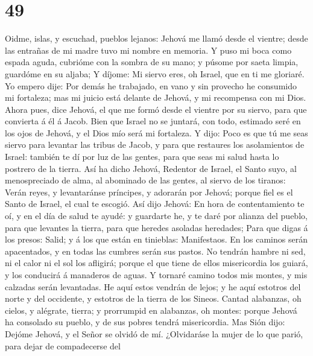 \hypertarget{section-48}{%
\section{49}\label{section-48}}

 Oidme, islas, y escuchad, pueblos lejanos: Jehová me
llamó desde el vientre; desde las entrañas de mi madre tuvo mi nombre en
memoria.  Y puso mi boca como espada aguda, cubrióme con
la sombra de su mano; y púsome por saeta limpia, guardóme en su aljaba;
 Y díjome: Mi siervo eres, oh Israel, que en ti me
gloriaré.  Yo empero dije: Por demás he trabajado, en vano
y sin provecho he consumido mi fortaleza; mas mi juicio está delante de
Jehová, y mi recompensa con mi Dios.  Ahora pues, dice
Jehová, el que me formó desde el vientre por su siervo, para que
convierta á él á Jacob. Bien que Israel no se juntará, con todo,
estimado seré en los ojos de Jehová, y el Dios mío será mi fortaleza.
 Y dijo: Poco es que tú me seas siervo para levantar las
tribus de Jacob, y para que restaures los asolamientos de Israel:
también te dí por luz de las gentes, para que seas mi salud hasta lo
postrero de la tierra.  Así ha dicho Jehová, Redentor de
Israel, el Santo suyo, al menospreciado de alma, al abominado de las
gentes, al siervo de los tiranos: Verán reyes, y levantaránse príncipes,
y adorarán por Jehová; porque fiel es el Santo de Israel, el cual te
escogió.  Así dijo Jehová: En hora de contentamiento te
oí, y en el día de salud te ayudé: y guardarte he, y te daré por alianza
del pueblo, para que levantes la tierra, para que heredes asoladas
heredades;  Para que digas á los presos: Salid; y á los
que están en tinieblas: Manifestaos. En los caminos serán apacentados, y
en todas las cumbres serán sus pastos.  No tendrán hambre
ni sed, ni el calor ni el sol los afligirá; porque el que tiene de ellos
misericordia los guiará, y los conducirá á manaderos de aguas.
 Y tornaré camino todos mis montes, y mis calzadas serán
levantadas.  He aquí estos vendrán de lejos; y he aquí
estotros del norte y del occidente, y estotros de la tierra de los
Sineos.  Cantad alabanzas, oh cielos, y alégrate, tierra;
y prorrumpid en alabanzas, oh montes: porque Jehová ha consolado su
pueblo, y de sus pobres tendrá misericordia.  Mas Sión
dijo: Dejóme Jehová, y el Señor se olvidó de mí. 
¿Olvidaráse la mujer de lo que parió, para dejar de compadecerse del
